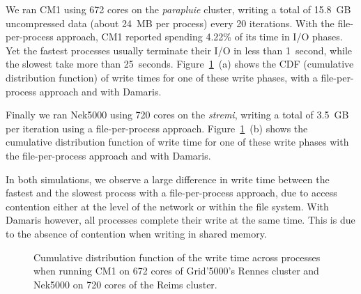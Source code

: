 We ran CM1 using 672 cores on the \emph{parapluie} cluster, writing a total of 15.8~GB uncompressed data 
(about 24~MB per process) every 20 iterations.
With the file-per-process approach, CM1 reported spending 4.22\% of its time in 
I/O phases. Yet the fastest processes usually terminate their I/O in less than 
1~second, while the slowest take more than 25~seconds.
Figure~\ref{fig:g5k_write_time}~(a) shows the CDF (cumulative distribution function) of write times for one of these write
phases, with a file-per-process approach and with Damaris. 

Finally we ran Nek5000 using 720 cores on the \emph{stremi}, writing a total of 3.5~GB per iteration
using a file-per-process approach.
Figure~\ref{fig:g5k_write_time}~(b) shows the cumulative distribution function of write time 
for one of these write phases with the file-per-process approach and with Damaris. 

In both simulations, we observe a large difference in write time between the fastest
and the slowest process with a file-per-process approach, due to access contention either 
at the level of the network or within the file system. With Damaris however, 
all processes complete their write at the same time. This is due to the absence of contention 
when writing in shared memory.

\begin{figure}
	\begin{center}
	\quad
	\caption{Cumulative distribution function of the write time across processes when running CM1 on 672 cores of Grid'5000's Rennes
	cluster and Nek5000 on 720 cores of the Reims cluster.}\label{fig:g5k_write_time}
	\end{center}
\end{figure}

